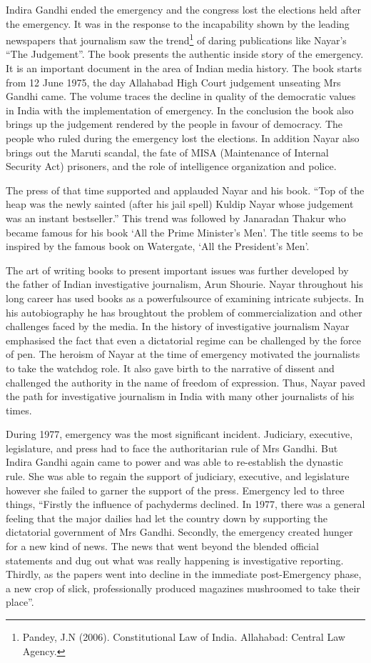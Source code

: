 \begin{multicols}{2}
\noi
Indira Gandhi ended the emergency and the congress lost the elections held after the
emergency. It was in the response to the incapability shown by the leading newspapers that
journalism saw the trend\footnote{Pandey, J.N (2006). Constitutional Law of India. Allahabad: Central Law Agency.}
of daring publications like Nayar’s “The Judgement”. The book
presents the authentic inside story of the emergency. It is an important document in the area of
Indian media history. The book starts from 12 June 1975, the day Allahabad High Court
judgement unseating Mrs Gandhi came. The volume traces the decline in quality of the
democratic values in India with the implementation of emergency. In the conclusion the book also brings up the judgement rendered by the people in favour of democracy. The people who
ruled during the emergency lost the elections. In addition Nayar also brings out the Maruti
scandal, the fate of MISA (Maintenance of Internal Security Act) prisoners, and the role of
intelligence organization and police.

\noi
The press of that time supported and applauded Nayar and his book. “Top of the heap was the
newly sainted (after his jail spell) Kuldip Nayar whose judgement was an instant bestseller.”
This trend was followed by Janaradan Thakur who became famous for his book ‘All the Prime
Minister’s Men’. The title seems to be inspired by the famous book on Watergate, ‘All the
President’s Men’.

\noi
The art of writing books to present important issues was further developed by the father of
Indian investigative journalism, Arun Shourie. Nayar throughout his long career has used books
as a powerfulsource of examining intricate subjects. In his autobiography he has broughtout the
problem of commercialization and other challenges faced by the media. In the history of
investigative journalism Nayar emphasised the fact that even a dictatorial regime can be
challenged by the force of pen. The heroism of Nayar at the time of emergency motivated the
journalists to take the watchdog role. It also gave birth to the narrative of dissent and challenged
the authority in the name of freedom of expression. Thus, Nayar paved the path for
investigative journalism in India with many other journalists of his times.

\noi
During 1977, emergency was the most significant incident. Judiciary, executive, legislature,
and press had to face the authoritarian rule of Mrs Gandhi. But Indira Gandhi again came to
power and was able to re-establish the dynastic rule. She was able to regain the support of
judiciary, executive, and legislature however she failed to garner the support of the press.
Emergency led to three things, “Firstly the influence of pachyderms declined. In 1977, there
was a general feeling that the major dailies had let the country down by supporting the
dictatorial government of Mrs Gandhi. Secondly, the emergency created hunger for a new kind
of news. The news that went beyond the blended official statements and dug out what was
really happening is investigative reporting. Thirdly, as the papers went into decline in the
immediate post-Emergency phase, a new crop of slick, professionally produced magazines
mushroomed to take their place”.


\end{multicols}
